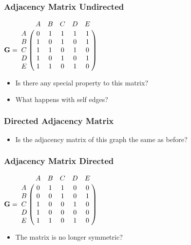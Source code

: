\documentclass[11pt]{beamer}
\begin{document}
\begin{frame}\frametitle{Adjacency Matrix Undirected}
\begin{center}
$
\mathbf{G} = 
    \bordermatrix{ 
        & A & B & C & D & E \cr
      A & 0 & 1 & 1 & 1 & 1 \cr
      B & 1 & 0 & 1 & 0 & 1 \cr
      C & 1 & 1 & 0 & 1 & 0 \cr
      D & 1 & 0 & 1 & 0 & 1 \cr
      E & 1 & 1 & 0 & 1 & 0 
      }
$
\end{center}
\pause
\begin{itemize}
\item Is there any special property to this matrix? 
\pause
\item What happens with self edges?
\end{itemize}
\end{frame}

\begin{frame}\frametitle{Directed Adjacency Matrix}
\begin{itemize}
\item Is the adjacency matrix of this graph the same as before?
\end{itemize}
\begin{center}
\end{center}
\end{frame}

\begin{frame}\frametitle{Adjacency Matrix Directed}
\begin{center}
$
\mathbf{G} = 
    \bordermatrix{ 
        & A & B & C & D & E \cr
      A & 0 & 1 & 1 & 0 & 0 \cr
      B & 0 & 0 & 1 & 0 & 1 \cr
      C & 1 & 0 & 0 & 1 & 0 \cr
      D & 1 & 0 & 0 & 0 & 0 \cr
      E & 1 & 1 & 0 & 1 & 0 
      }
$
\end{center}
\pause
\begin{itemize}
\item The matrix is no longer symmetric? 
\end{itemize}
\end{frame}
\end{document}
